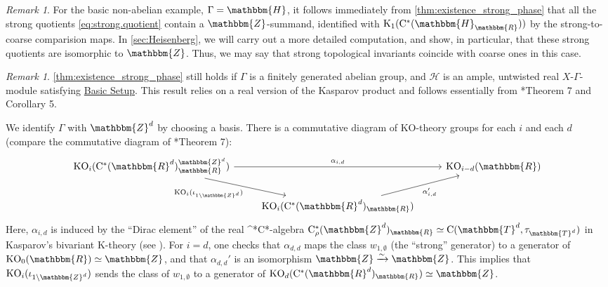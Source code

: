 \documentclass{amsart}
\numberwithin{figure}{section}
\numberwithin{equation}{section}
\numberwithin{table}{section}
\theoremstyle{plain}
\theoremstyle{definition}
\theoremstyle{remark}
\newtheorem{remark}[equation]{Remark}
\theoremstyle{nonumber}
\newcommand{\refbasicsetup}{\hyperref[basic_setup]{Basic Setup}}
\newcommand{\Z}{\mathbb{Z}}
\newcommand{\R}{\mathbb{R}}
\newcommand{\T}{\mathbb{T}}
\newcommand{\HH}{\mathbb{H}} %
\newcommand{\K}{\relax\ifmmode\operatorname{K}\else\textup{K}\fi}
\newcommand{\KO}{\relax\ifmmode\operatorname{KO}\else\textup{KO}\fi}
\newcommand{\Cst}{\relax\ifmmode\mathrm{C}^*\else\textup{C*}\fi}
\newcommand{\Cont}{\mathrm{C}}
\newcommand{\Cstr}{\Cst_\rho} %
\renewcommand{\mathbb}{\mathbbm} %
\begin{document}
\begin{remark}
For the basic non-abelian example, $\Gamma=\HH$, it follows immediately
from \cref{thm:existence_strong_phase} that all the strong quotients
\eqref{eq:strong.quotient} contain a $\Z$-summand, identified with
$\K_1(\Cst(\HH_\R))$ by the strong-to-coarse comparision maps.
In \cref{sec:Heisenberg}, we will carry out a more detailed
computation, and show, in particular, that these strong quotients are
isomorphic to $\Z$. Thus, we may say that strong topological invariants
coincide with coarse ones in this case.
\end{remark}

\begin{remark}\label{rmk:untwisted_real_abelian_strong_to_coarse}
\cref{thm:existence_strong_phase} still holds if \( \Gamma \) is a
finitely generated abelian group, and \( \mathcal{H} \) is an ample,
untwisted real \( X \)-\( \Gamma \)-module satisfying \refbasicsetup. This
result relies on a real version of the Kasparov product
\cite{Kasparov:Equivariant_KK-theory} and follows essentially from
\cite{Ewert-Meyer:Coarse_geometry}*{Theorem 7 and Corollary 5}.

We identify \( \Gamma \) with \( \Z^d \) by choosing a basis.
There is a commutative diagram of KO-theory groups for each \( i \) and
each \( d \) (compare the commutative diagram of
\cite{Ewert-Meyer:Coarse_geometry}*{Theorem 7}):
\[ \begin{tikzcd}
\KO_i(\Cst(\R^d)^{\Z^d}_\R) \arrow[rr, "\alpha_{i,d}"] 
\arrow[rd, "\KO_{i}(\iota_{1\backslash \Z^d})"'] 
&& \KO_{i-d}(\R) \\ 
&  \KO_i(\Cst(\R^d)_\R) \arrow[ru, "\alpha'_{i,d}"'] 
\end{tikzcd} \]
Here, \( \alpha_{i,d} \) is induced by the ``Dirac element''
of the real \Cst-algebra 
\( \Cstr(\Z^d)_\R\simeq\Cont(\T^d,\tau_{\T^d})
\) in Kasparov's bivariant K-theory (see
). 
For \( i=d \), one checks that \( \alpha_{d,d} \) maps the class \(
w_{1,\emptyset} \) (the ``strong'' generator) to a generator of \(
\KO_0(\R)\simeq\Z \), and that \( \alpha_{d,d}' \) is an isomorphism \(
\Z\xrightarrow{\sim}\Z \). This implies that \( \KO_i(\iota_{1\backslash
\Z^d}) \) sends
the class of \( w_{1,\emptyset} \) to a generator of
\( \KO_d(\Cst(\R^d)_\R)\simeq\Z \).


\end{remark}
\end{document}
